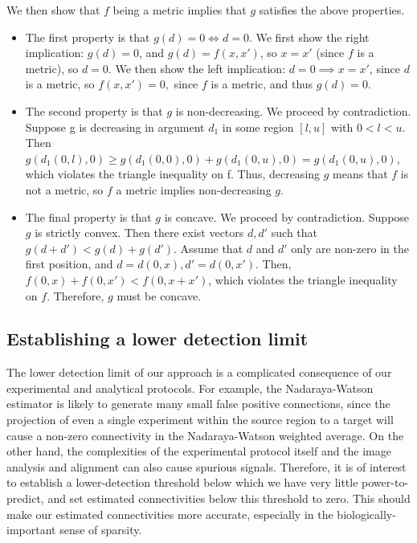 We then show that $f$ being a metric implies that $g$ satisfies the above properties.
\begin{itemize}
    \item The first property is that $g(d) = 0 \Longleftrightarrow d = 0$. We first show the right implication: $g(d) = 0$, and $g(d) = f(x,x')$, so $x = x'$ (since $f$ is a metric), so $d = 0$. We then show the left implication: $d = 0 \implies x = x'$, since $d$ is a metric, so $f(x,x') = 0,$ since $f$ is a metric, and thus $g(d) = 0$.
    \item The second property is that $g$ is non-decreasing. We proceed by contradiction.
    Suppose g is decreasing in argument $d_1$ in some region $[l, u]$ with $0 < l< u$.
    Then $g(d_1(0, l), 0) \geq g(d_1(0, 0), 0) + g(d_1(0, u), 0) = g(d_1(0, u),0)$, which violates the triangle inequality on f. Thus, decreasing $g$ means that $f$ is not a metric, so $f$ a metric implies non-decreasing $g$.
    \item The final property is that $g$ is concave. We proceed by contradiction. Suppose $g$ is strictly convex. Then there exist vectors $d, d'$ such that $g(d + d')  < g(d) + g(d')$.  Assume that $d$ and $d'$ only are non-zero in the first position, and $d = d(0, x), d' = d(0,x')$.  Then, $f(0,x) + f(0,x') <  f(0,x+ x')$, which violates the triangle inequality on $f$.  Therefore, $g$ must be concave.
\end{itemize}

\newpage

\subsection{Establishing a lower detection limit}
\label{supp_sec:methods_lower}

The lower detection limit of our approach is a complicated consequence of our experimental and analytical protocols.
For example, the Nadaraya-Watson estimator is likely to generate many small false positive connections, since the projection of even a single experiment within the source region to a target will cause a non-zero connectivity in the Nadaraya-Watson weighted average.
On the other hand, the complexities of the experimental protocol itself and the image analysis and alignment can also cause spurious signals.
Therefore, it is of interest to establish a lower-detection threshold below which we have very little power-to-predict, and set estimated connectivities below this threshold to zero.
This should make our estimated connectivities more accurate, especially in the biologically-important sense of sparsity.

